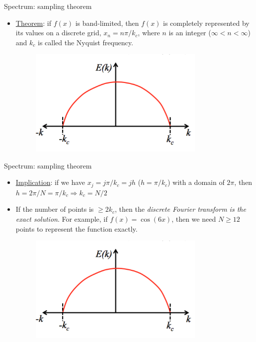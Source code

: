 \begin{frame}{Spectrum: sampling theorem}
\begin{itemize}
	\item \underline{Theorem}: if $f(x)$ is band-limited, then $f(x)$ is completely represented by its values on a discrete grid, $x_n = n\pi/k_c$, where $n$ is an integer ($\infty < n < \infty$) and $k_c$ is called the Nyquist frequency.
	\begin{figure}
		\includegraphics[width=0.8\textwidth]{sampling1.png}
	\end{figure}
\end{itemize}
\end{frame}

\begin{frame}{Spectrum: sampling theorem}
\begin{itemize}
	\item \underline{Implication}: if we have $x_j = j\pi/k_c = jh$ ($h = \pi/k_c$) with a domain of $2\pi$, then $h=2\pi/N = \pi/k_c \Rightarrow k_c = N/2$
	\item If the number of points is $\geq 2k_c$, then the \textit{discrete Fourier transform is the exact solution}. For example, if $f(x)=\cos (6x)$, then we need $N \geq 12$ points to represent the function exactly.
	\begin{figure}
		\includegraphics[width=0.8\textwidth]{sampling1.png}
	\end{figure}
\end{itemize}
\end{frame}

